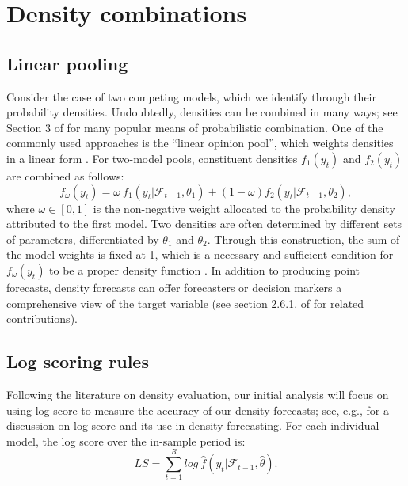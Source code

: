 \documentclass{monashthesis}
\begin{document}
\hypertarget{density-combinations}{%
\section{Density combinations}\label{density-combinations}}

\subsection*{Linear pooling}

Consider the case of two competing models, which we identify through their probability densities. Undoubtedly, densities can be combined in many ways; see Section 3 of \textcite{WHLK22} for many popular means of probabilistic combination. One of the commonly used approaches is the ``linear opinion pool'', which weights densities in a linear form \autocites[e.g.,][]{BG69,HM07,GA11}. For two-model pools, constituent densities \(f_1(y_t)\) and \(f_2(y_t)\) are combined as follows:
\begin{equation*}
f_{\omega}(y_t) = \omega \ f_1(y_t | \mathcal{F}_{t-1}, \theta_{1}) + (1-\omega) f_2(y_t | \mathcal{F}_{t-1}, \theta_{2}),
\end{equation*}
where \(\omega \in [0,1]\) is the non-negative weight allocated to the probability density attributed to the first model. Two densities are often determined by different sets of parameters, differentiated by \(\theta_{1}\) and \(\theta_{2}\). Through this construction, the sum of the model weights is fixed at 1, which is a necessary and sufficient condition for \(f_{\omega}(y_t)\) to be a proper density function \autocite{GA11}. In addition to producing point forecasts, density forecasts can offer forecasters or decision markers a comprehensive view of the target variable (see section 2.6.1. of \textcite{FTP22} for related contributions).

\vspace{5mm}

\subsection*{Log scoring rules}

Following the literature on density evaluation, our initial analysis will focus on using log score to measure the accuracy of our density forecasts; see, e.g., \textcite{GA11} for a discussion on log score and its use in density forecasting. For each individual model, the log score over the in-sample period is:\\
\begin{equation*}
LS = \sum^R_{t=1} log \ \hat f(y_t| \mathcal{F}_{t-1}, \hat\theta).
\end{equation*}
\end{document}
